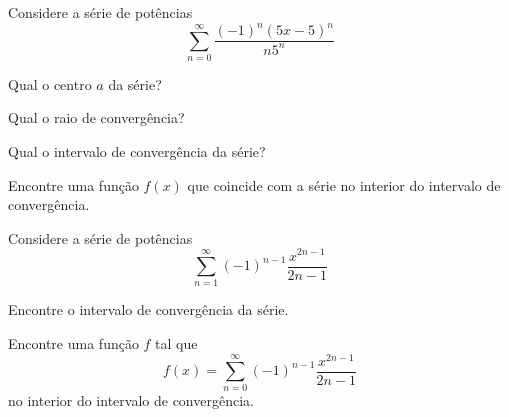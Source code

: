 \begin{exercises*}

\begin{exercise}
  Considere a série de potências
  \[
    \sum_{n=0}^\infty \frac{(-1)^n(5x-5)^{n}}{n5^{n}}
  \]
  \vspace{-\baselineskip}
  \begin{alphalist}
    \item Qual o centro $a$ da série?
    \item Qual o raio de convergência?
    \item Qual o intervalo de convergência da série?
    \item Encontre uma função $f(x)$ que coincide com a série no interior do intervalo de convergência.
  \end{alphalist}
\end{exercise}

\begin{exercise}
  Considere a série de potências
  \[\sum_{n=1}^\infty (-1)^{n-1}\frac{x^{2n-1}}{2n-1}\]
  \begin{alphalist}
    \item Encontre o intervalo de convergência da série.
    \item Encontre uma função $f$ tal que
      \[ f(x)=\sum_{n=0}^\infty (-1)^{n-1}\frac{x^{2n-1}}{2n-1}\]
    no interior do intervalo de convergência.
  \end{alphalist}
\end{exercise}


\end{exercises*}

